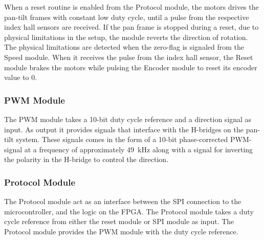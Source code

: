 \documentclass[../../main.tex]{subfiles}
\begin{document}
When a reset routine is enabled from the Protocol module, the motors drives the pan-tilt frames with constant low duty cycle, until a pulse from the respective index hall sensors are received. If the pan frame is stopped during a reset, due to physical limitations in the setup, the module reverts the direction of rotation. The physical limitations are detected when the zero-flag is signaled from the Speed module. When it receives the pulse from the index hall sensor, the Reset module brakes the motors while pulsing the Encoder module to reset its encoder value to 0. 




\subsubsection*{PWM Module}
The PWM module takes a 10-bit duty cycle reference and a direction signal as input. As output it provides signals that interface with the H-bridges on the pan-tilt system. These signals comes in the form of a 10-bit phase-corrected PWM-signal at a frequency of approximately \SI{49}{\kilo \hertz} along with a signal for inverting the polarity in the H-bridge to control the direction. 

\subsubsection*{Protocol Module}
The Protocol module act as an interface between the SPI connection to the microcontroller, and the logic on the FPGA. The Protocol module takes a duty cycle reference from either the reset module or SPI module as input. The Protocol module provides the PWM module with the duty cycle reference.
\end{document}
